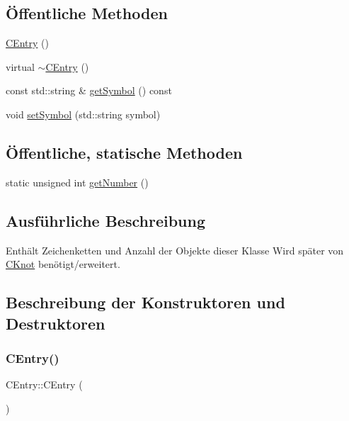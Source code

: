 \subsection*{Öffentliche Methoden}
\begin{DoxyCompactItemize}
\item 
\hyperlink{class_c_entry_a4faded7dce7c143eeb3c96de4071848d}{C\+Entry} ()
\item 
virtual \hyperlink{class_c_entry_adb596f3be932c1db3d6072a9d6d26f5e}{$\sim$\+C\+Entry} ()
\item 
const std\+::string \& \hyperlink{class_c_entry_aede4d6e03efa3abb0ed56349edb5b86d}{get\+Symbol} () const
\item 
void \hyperlink{class_c_entry_a2ac2cbee24817ff5b67e09f03a952e77}{set\+Symbol} (std\+::string symbol)
\end{DoxyCompactItemize}
\subsection*{Öffentliche, statische Methoden}
\begin{DoxyCompactItemize}
\item 
static unsigned int \hyperlink{class_c_entry_a6e8cde8d4a78cc65fceeb5f0430a2b55}{get\+Number} ()
\end{DoxyCompactItemize}


\subsection{Ausführliche Beschreibung}
Enthält Zeichenketten und Anzahl der Objekte dieser Klasse Wird später von \hyperlink{class_c_knot}{C\+Knot} benötigt/erweitert. 

\subsection{Beschreibung der Konstruktoren und Destruktoren}
\mbox{\label{class_c_entry_a4faded7dce7c143eeb3c96de4071848d}} 
\subsubsection{\texorpdfstring{C\+Entry()}{CEntry()}}
{\footnotesize\ttfamily C\+Entry\+::\+C\+Entry (\begin{DoxyParamCaption}{ }\end{DoxyParamCaption})}

